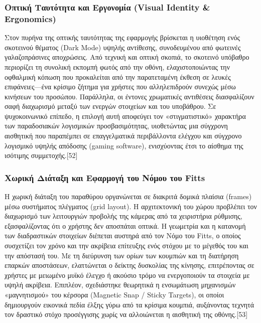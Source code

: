 \documentclass[twoside, a4paper, 11pt]{article}
\begin{document}
\subsubsection{Οπτική Ταυτότητα και Εργονομία (Visual Identity \& Ergonomics)}
Στον πυρήνα της οπτικής ταυτότητας της εφαρμογής βρίσκεται η υιοθέτηση ενός σκοτεινού θέματος (Dark Mode) υψηλής αντίθεσης, 
συνοδευμένου από φωτεινές γαλαζοπράσινες αποχρώσεις. Από τεχνική και οπτική σκοπιά, το σκοτεινό υπόβαθρο περιορίζει τη συνολική εκπομπή φωτός από την οθόνη, 
ελαχιστοποιώντας την οφθαλμική κόπωση που προκαλείται από την παρατεταμένη έκθεση σε λευκές επιφάνειες—ένα κρίσιμο ζήτημα για χρήστες που αλληλεπιδρούν συνεχώς μέσω κινήσεων 
του προσώπου. Παράλληλα, οι έντονες χρωματικές αντιθέσεις διασφαλίζουν σαφή διαχωρισμό μεταξύ των ενεργών στοιχείων και του υποβάθρου. Σε ψυχοκοινωνικό επίπεδο, 
η επιλογή αυτή αποφεύγει τον «στιγματιστικό» χαρακτήρα των παραδοσιακών λογισμικών προσβασιμότητας, υιοθετώντας μια σύγχρονη αισθητική που παραπέμπει σε επαγγελματικά περιβάλλοντα 
ελέγχου και σύγχρονο λογισμικό υψηλής απόδοσης (gaming software), ενισχύοντας έτσι το αίσθημα της ισότιμης συμμετοχής.[52]

\subsubsection{Χωρική Διάταξη και Εφαρμογή του Νόμου του Fitts}
Η χωρική διάταξη του παραθύρου οργανώνεται σε διακριτά δομικά πλαίσια (frames) μέσω συστήματος πλέγματος (grid layout). 
Η αρχιτεκτονική του χώρου προβλέπει τον διαχωρισμό των λειτουργιών προβολής της κάμερας από τα χειριστήρια ρύθμισης, εξασφαλίζοντας ότι ο χρήστης δεν αποσπάται οπτικά. 
Η γεωμετρία και η κατανομή των διαδραστικών στοιχείων διέπεται αυστηρά από τον Νόμο του Fitts, ο οποίος συσχετίζει τον χρόνο και την ακρίβεια επίτευξης ενός στόχου με το μέγεθός 
του και την απόστασή του. Με τη διεύρυνση των ορίων των κουμπιών και τη διατήρηση επαρκών αποστάσεων, ελαττώνεται ο δείκτης δυσκολίας της κίνησης, επιτρέποντας σε χρήστες με μειωμένο 
μυϊκό έλεγχο ή ακούσιο τρόμο να ενεργοποιούν τα στοιχεία με υψηλή ακρίβεια. Επιπλέον, σχεδιάστηκε θεωρητικά η ενσωμάτωση μηχανισμών «μαγνητισμού» του 
κέρσορα (Magnetic Snap / Sticky Targets), οι οποίοι δημιουργούν εικονικά πεδία έλξης γύρω από τα κρίσιμα κουμπιά, αυξάνοντας τεχνητά τον δραστικό στόχο προσέγγισης 
χωρίς να αλλοιώνεται η αισθητική της οθόνης.[53]
\end{document}
